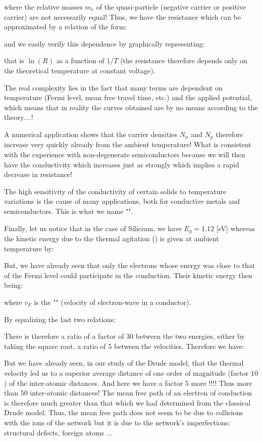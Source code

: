 	where the relative masses $m_e$ of the quasi-particle (negative carrier or positive carrier) are not necessarily equal! Thus, we have the resistance which can be approximated by a relation of the form:
	
	and we easily verify this dependence by graphically representing:
	
	that is $\ln(R)$ as a function of $1/T$ (the resistance therefore depends only on the theoretical temperature at constant voltage).
	
	The real complexity lies in the fact that many terms are dependent on temperature (Fermi level, mean free travel time, etc.) and the applied potential, which means that in reality the curves obtained are by no means according to the theory....!
	
	A numerical application shows that the carrier densities $N_n$ and $N_p$ therefore increase very quickly already from the ambient temperature! What is consistent with the experience with non-degenerate semiconductors because we will then have the conductivity which increases just as strongly which implies a rapid decrease in resistance!
	
	The high sensitivity of the conductivity of certain solids to temperature variations is the cause of many applications, both for conductive metals and semiconductors. This is what we name "".
	
	Finally, let us notice that in the case of Silicium, we have $E_g=1.12$ [eV] whereas the kinetic energy due to the thermal agitation () is given at ambient temperature by:
	
	But, we have already seen that only the electrons whose energy was close to that of the Fermi level could participate in the conduction. Their kinetic energy then being:
	
	where $v_F$ is the "" (velocity of electron-wave in a conductor).
	
	By equalizing the last two relations:
	
	There is therefore a ratio of a factor of $30$ between the two energies, either by taking the square root, a ratio of $5$ between the velocities. Therefore we have:
	
	 But we have already seen, in our study of the Drude model, that the thermal velocity led us to a superior average distance of one order of magnitude (factor $10$) of the inter-atomic distances. And here we have a factor $5$ more !!!! Thus more than $50$ inter-atomic distances! The mean free path of an electron of conduction is therefore much greater than that which we had determined from the classical Drude model. Thus, the mean free path does not seem to be due to collisions with the ions of the network but it is due to the network's imperfections: structural defects, foreign atoms ...

